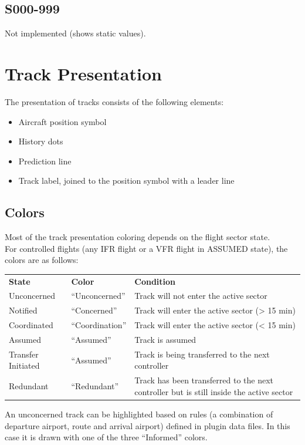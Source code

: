 \documentclass[11pt,a4paper,oldfontcommands]{memoir}
\begin{document}
\subsection{S000-999}
Not implemented (shows static values).

\section{Track Presentation}
The presentation of tracks consists of the following elements:
\begin{itemize}
\item{Aircraft position symbol}
\item{History dots}
\item{Prediction line}
\item{Track label, joined to the position symbol with a leader line}
\end{itemize}

\subsection{Colors}
Most of the track presentation coloring depends on the flight sector state.
\\For controlled flights (any IFR flight or a VFR flight in ASSUMED state), the colors are as follows:\\
\begin{tabular}{p{5cm}p{5cm}p{5cm}}
\textbf{State}          & \textbf{Color}    & \textbf{Condition}
\\Unconcerned           & “Unconcerned”     & Track will not enter the active sector
\\Notified              & “Concerned”       & Track will enter the active sector (> 15 min)
\\Coordinated           & “Coordination”    & Track will enter the active sector (< 15 min)
\\Assumed               & “Assumed”         & Track is assumed
\\Transfer Initiated    & “Assumed”         & Track is being transferred to the next controller
\\Redundant             & “Redundant”       & Track has been transferred to the next controller but is still inside the active sector
\end{tabular}

An unconcerned track can be highlighted based on rules (a combination of departure airport, route and
arrival airport) defined in plugin data files. In this case it is drawn with one of the three “Informed” colors.\\
\end{document}
